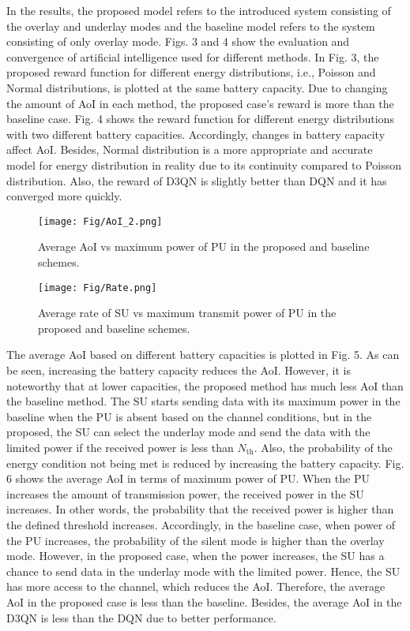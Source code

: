 \documentclass[journal]{IEEEtran}
\begin{document}
		In the results, the proposed model refers to the introduced system consisting of the overlay and underlay modes and the baseline model refers to the system consisting of only overlay mode. Figs. 3 and 4 show the evaluation and convergence of artificial intelligence used for different methods. In Fig. 3, the proposed reward function for different energy distributions, i.e., Poisson and Normal distributions, is plotted at the same battery capacity. Due to changing the amount of AoI in each method, the proposed case's reward is more than the baseline case. Fig. 4 shows the reward function for different energy distributions with two different battery capacities. Accordingly, changes in battery capacity affect AoI. Besides, Normal distribution is a more appropriate and accurate model for energy distribution in reality due to its continuity compared to Poisson distribution. Also, the reward of D3QN is slightly better than DQN and it has converged more quickly.

		\begin{figure}[!t]
			\centering
			\texttt{[image: Fig/AoI\_2.png]}
			\caption{Average AoI vs maximum power of PU in the proposed and baseline schemes.}
			\label{AoI2}
		\end{figure}
		\begin{figure}[!t]
			\centering
			\texttt{[image: Fig/Rate.png]}
			\caption{Average rate of SU vs maximum transmit power of PU in the proposed and baseline schemes.}
			\label{Rate}
		\end{figure}

		The average AoI based on different battery capacities is plotted in Fig. 5. As can be seen, increasing the battery capacity reduces the AoI. However, it is noteworthy that at lower capacities, the proposed method has much less AoI than the baseline method. The SU starts sending data with its maximum power in the baseline when the PU is absent based on the channel conditions, but in the proposed, the SU can select the underlay mode and send the data with the limited power if the received power is less than $N_\text{th}$. Also, the probability of the energy condition not being met is reduced by increasing the battery capacity. Fig. 6 shows the average AoI in terms of maximum power of PU. When the PU increases the amount of transmission power, the received power in the SU increases. In other words, the probability that the received power is higher than the defined threshold increases. Accordingly, in the baseline case, when power of the PU increases, the probability of the silent mode is higher than the overlay mode. However, in the proposed case, when the power increases, the SU has a chance to send data in the underlay mode with the limited power. Hence, the SU has more access to the channel, which reduces the AoI. Therefore, the average AoI in the proposed case is less than the baseline. Besides, the average AoI in the D3QN is less than the DQN due to better performance.
	
\end{document}
